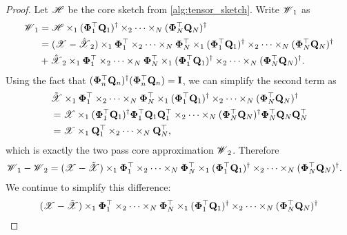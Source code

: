 \begin{proof}
Let $\T{H}$ be the core sketch from \ref{alg:tensor_sketch}.
Write %
$\T{W}_1$ as
\begin{equation}
\begin{aligned}
\T{W}_1 &= \T{H}\times_1 (\M{\Phi}_1^\top \M{Q}_1)^\dag \times_2 \cdots \times_N (\M{\Phi}^\top_N \M{Q}_N)^\dag \\
&= (\T{X} -  \hat{\T{X}}_2)\times_1 \M{\Phi}^\top_1 \times_2 \cdots \times_N \M{\Phi}^\top_N  \times_1 (\M{\Phi}^\top_1 \M{Q}_1)^\dag \times_2 \cdots \times_N (\M{\Phi}^\top_N \M{Q}_N)^\dag
\\
&+ \hat{\T{X}}_2\times_1 \M{\Phi}^\top_1 \times_2 \cdots \times_N \M{\Phi}^\top_N \times_1 (\M{\Phi}^\top_1 \M{Q}_1)^\dag \times_2 \cdots \times_N (\M{\Phi}^\top_N \M{Q}_N)^\dag.\nonumber
\end{aligned}
\end{equation}
Using the fact that $(\mathbf{\Phi}^\top_n \mathbf{Q}_n)^\dag (\mathbf{\Phi}^\top_n \mathbf{Q}_n) =\mathbf{I}$, we can simplify the second term as
\begin{equation}
\begin{aligned}
&\tilde{\T{X}}\times_1 \M{\Phi}^\top_1 \times_2 \cdots \times_N \M{\Phi}^\top_N \times_1 (\M{\Phi}^\top_1 \M{Q}_1)^\dag \times_2 \cdots \times_N (\M{\Phi}^\top_N \M{Q}_N)^\dag   \\
& = \T{X}\times_1 (\M{\Phi}^\top_1 \M{Q}_1)^\dag \M{\Phi}^\top_1\M{Q}_1\M{Q}_1^\top \times_2 \cdots \times_N (\M{\Phi}_N^\top \M{Q}_N)^\dag \M{\Phi}_N^\top\M{Q}_N\M{Q}_N^\top\\
& = \T{X}\times_1 \M{Q}_1^\top \times_2 \cdots \times_N \M{Q}_N^\top, \nonumber
\end{aligned}
\end{equation}
which is exactly the two pass core approximation $\T{W}_2$.
Therefore
\begin{equation}
\begin{aligned}
&\T{W}_1 -\T{W}_2= (\T{X} -  \tilde{\T{X}})\times_1 \M{\Phi}^\top_1 \times_2 \cdots \times_N \M{\Phi}^\top_N  \times_1 (\M{\Phi}^\top_1 \M{Q}_1)^\dag \times_2 \cdots \times_N (\M{\Phi}^\top_N \M{Q}_N)^\dag. \nonumber
\end{aligned}
\end{equation}
We continue to simplify this difference:
\begin{equation}
\begin{aligned}
(\T{X} -  \tilde{\T{X}})&\times_1 \M{\Phi}^\top_1 \times_2 \cdots \times_N \M{\Phi}^\top_N  \times_1 (\M{\Phi}^\top_1 \M{Q}_1)^\dag \times_2\cdots \times_N (\M{\Phi}^\top_N \M{Q}_N)^\dag \label{eq:core_err_decom} \\

\end{aligned}
\end{equation}
\end{proof}
